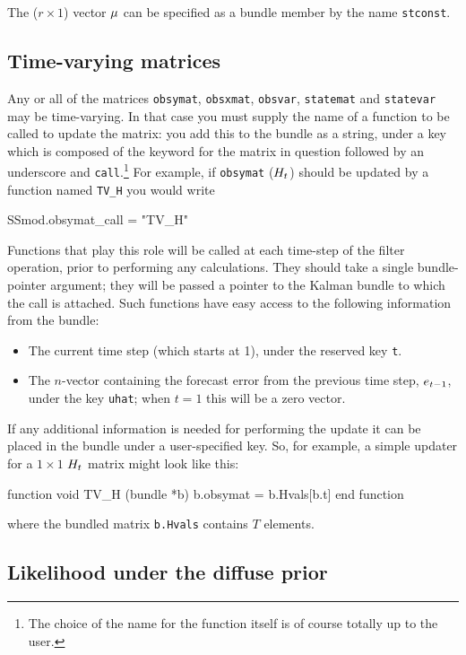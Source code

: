\documentclass[a4paper]{article}
\begin{document}
The ($r \times 1$) vector $\mu$ can be specified as a bundle
member by the name \texttt{stconst}.

\subsection{Time-varying matrices}
\label{sec:tvarying}

Any or all of the matrices \texttt{obsymat}, \texttt{obsxmat},
\texttt{obsvar}, \texttt{statemat} and \texttt{statevar} may be
time-varying.  In that case you must supply the name of a function to
be called to update the matrix: you add this to the bundle as a
string, under a key which is composed of the keyword for the matrix in
question followed by an underscore and \texttt{call}.\footnote{The
  choice of the name for the function itself is of course totally up
  to the user.} For example, if \texttt{obsymat} ($H_t$) should
be updated by a function named \texttt{TV\_H} you would write
%
\begin{code}
SSmod.obsymat_call = "TV_H"
\end{code}
%
Functions that play this role will be called at each time-step of the
filter operation, prior to performing any calculations.  They should
take a single bundle-pointer argument; they will be passed a pointer
to the Kalman bundle to which the call is attached.  Such functions
have easy access to the following information from the bundle:
\begin{itemize}
\item The current time step (which starts at 1), under the
  reserved key \texttt{t}.
\item The $n$-vector containing the forecast error from the
  previous time step, $e_{t-1}$, under the key \texttt{uhat};
  when $t=1$ this will be a zero vector.
\end{itemize}

If any additional information is needed for performing the update it
can be placed in the bundle under a user-specified key.  So, for
example, a simple updater for a $1 \times 1$ $H_t$ matrix might
look like this:
%
\begin{code}
function void TV_H (bundle *b)
    b.obsymat = b.Hvals[b.t]
end function
\end{code}
%
where the bundled matrix \texttt{b.Hvals} contains $T$ elements.

\subsection{Likelihood under the diffuse prior}
\label{sec:lldiffuse}
\end{document}

